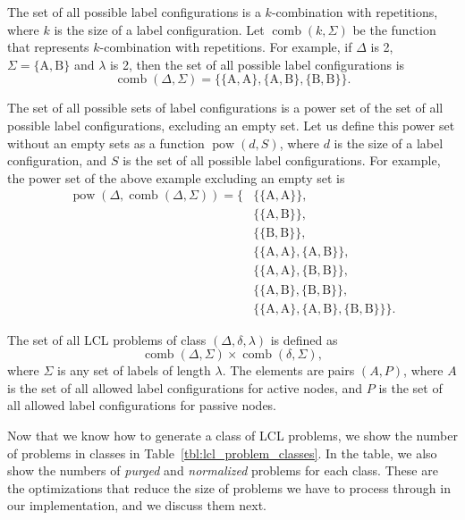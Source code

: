 The set of all possible label configurations is a $k$-combination with repetitions, where $k$ is the size of a label configuration.
Let $\operatorname{comb}(k, \Sigma)$ be the function that represents $k$-combination with repetitions.
For example, if $\Delta$ is 2, $\Sigma=\{\mathrm{A, B}\}$ and $\lambda$ is 2, then the set of all possible label configurations is
$$ \operatorname{comb}(\Delta, \Sigma) = \{ \{\mathrm{A, A}\}, \{\mathrm{A, B}\}, \{\mathrm{B, B}\} \}. $$

The set of all possible sets of label configurations is a power set of the set of all possible label configurations, excluding an empty set.
Let us define this power set without an empty sets as a function $\operatorname{pow}(d, S)$, where $d$ is the size of a label configuration, and $S$ is the set of all possible label configurations.
For example, the power set of the above example excluding an empty set is
\begin{align*}
  \operatorname{pow}(\Delta, \operatorname{comb}(\Delta, \Sigma)) =  \{&\{\{\mathrm{A, A}\}\}, \\
    &\{\{\mathrm{A, B}\}\}, \\
    &\{\{\mathrm{B, B}\}\}, \\
    &\{\{\mathrm{A, A}\}, \{\mathrm{A, B}\}\}, \\
    &\{\{\mathrm{A, A}\}, \{\mathrm{B, B}\}\}, \\
    &\{\{\mathrm{A, B}\}, \{\mathrm{B, B}\}\}, \\
    &\{\{\mathrm{A, A}\}, \{\mathrm{A, B}\}, \{\mathrm{B, B}\}\} \}.
\end{align*}

The set of all LCL problems of class $(\Delta, \delta, \lambda)$ is defined as
$$ \operatorname{comb}(\Delta, \Sigma) \times \operatorname{comb}(\delta, \Sigma),$$
where $\Sigma$ is any set of labels of length $\lambda$.
The elements are pairs $(A, P)$, where $A$ is the set of all allowed label configurations for active nodes, and $P$ is the set of all allowed label configurations for passive nodes.

Now that we know how to generate a class of LCL problems, we show the number of problems in classes in Table~\ref{tbl:lcl_problem_classes}.
In the table, we also show the numbers of \emph{purged} and \emph{normalized} problems for each class.
These are the optimizations that reduce the size of problems we have to process through in our implementation, and we discuss them next.


